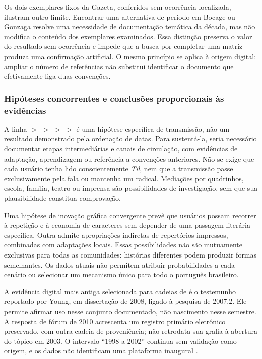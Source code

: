 Os dois exemplares fixos da Gazeta, conferidos sem ocorrência localizada, ilustram outro limite. Encontrar uma alternativa de período em Bocage ou Gonzaga resolve uma necessidade de documentação temática da década, mas não modifica o conteúdo dos exemplares examinados. Essa distinção preserva o valor do resultado sem ocorrência e impede que a busca por completar uma matriz produza uma confirmação artificial. O mesmo princípio se aplica à origem digital: ampliar o número de referências não substitui identificar o documento que efetivamente liga duas convenções.

\subsubsection{Hipóteses concorrentes e conclusões proporcionais às evidências}
A linha  $>$  $>$  $>$  $>$  é uma hipótese específica de transmissão, não um resultado demonstrado pela ordenação de datas. Para sustentá-la, seria necessário documentar etapas intermediárias e canais de circulação, com evidências de adaptação, aprendizagem ou referência a convenções anteriores. Não se exige que cada usuário tenha lido conscientemente \textit{Til}, nem que a transmissão passe exclusivamente pela fala ou mantenha um radical. Mediações por quadrinhos, escola, família, teatro ou imprensa são possibilidades de investigação, sem que sua plausibilidade constitua comprovação.

Uma hipótese de inovação gráfica convergente prevê que usuários possam recorrer à repetição e à economia de caracteres sem depender de uma passagem literária específica. Outra admite apropriações indiretas de repertórios impressos, combinadas com adaptações locais. Essas possibilidades não são mutuamente exclusivas para todas as comunidades: histórias diferentes podem produzir formas semelhantes. Os dados atuais não permitem atribuir probabilidades a cada cenário ou selecionar um mecanismo único para todo o português brasileiro.

A evidência digital mais antiga selecionada para cadeias de  é o testemunho reportado por Young, em dissertação de 2008, ligado à pesquisa de 2007.2. Ele permite afirmar uso nesse conjunto documentado, não nascimento nesse semestre. A resposta de fórum de 2010 acrescenta um registro primário eletrônico preservado, com outra cadeia de proveniência; não retrodata sua grafia à abertura do tópico em 2003. O intervalo ``1998 a 2002'' continua sem validação como origem, e os dados não identificam uma plataforma inaugural \cite{young2008,r4forumcifraclub}.

